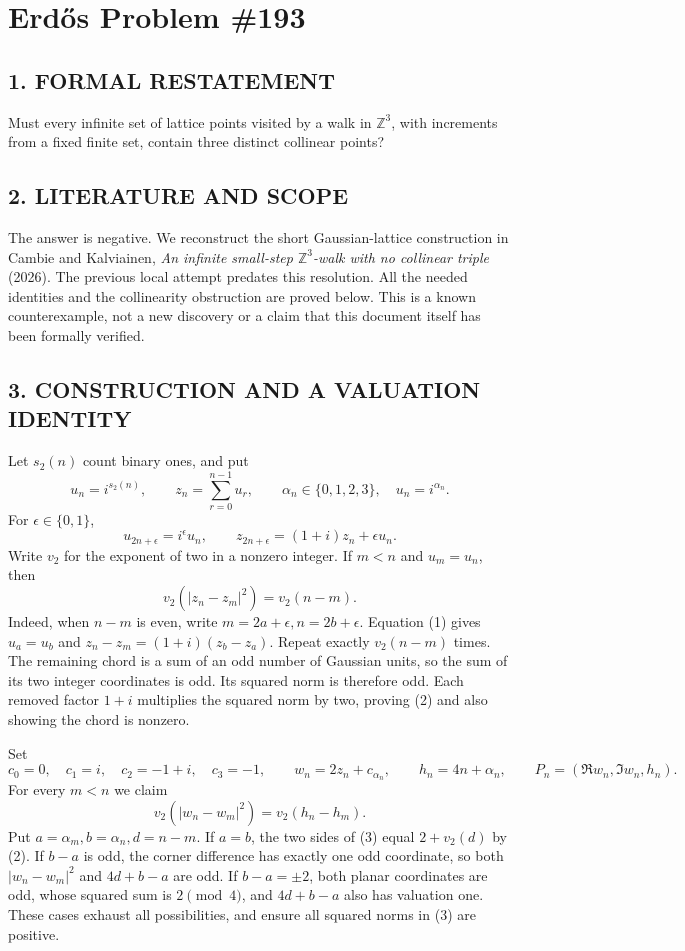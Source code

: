 \section{Erd\H{o}s Problem \#193}
\subsection*{1. FORMAL RESTATEMENT}
Must every infinite set of lattice points visited by a walk in $\mathbb Z^3$, with increments from a fixed finite set, contain three distinct collinear points?
\subsection*{2. LITERATURE AND SCOPE}
The answer is negative. We reconstruct the short Gaussian-lattice construction in Cambie and Kalviainen, \emph{An infinite small-step $\mathbb Z^3$-walk with no collinear triple} (2026). The previous local attempt predates this resolution. All the needed identities and the collinearity obstruction are proved below. This is a known counterexample, not a new discovery or a claim that this document itself has been formally verified.
\subsection*{3. CONSTRUCTION AND A VALUATION IDENTITY}
Let $s_2(n)$ count binary ones, and put
\[
 u_n=i^{s_2(n)},\qquad z_n=\sum_{r=0}^{n-1}u_r,\qquad
 \alpha_n\in\{0,1,2,3\},\quad u_n=i^{\alpha_n}.
\]
For $\epsilon\in\{0,1\}$,
\[
 u_{2n+\epsilon}=i^\epsilon u_n,\qquad
 z_{2n+\epsilon}=(1+i)z_n+\epsilon u_n.                 \tag{1}
\]
Write $v_2$ for the exponent of two in a nonzero integer. If $m<n$ and $u_m=u_n$, then
\[
 v_2(|z_n-z_m|^2)=v_2(n-m).                           \tag{2}
\]
Indeed, when $n-m$ is even, write $m=2a+\epsilon,n=2b+\epsilon$. Equation (1) gives $u_a=u_b$ and $z_n-z_m=(1+i)(z_b-z_a)$. Repeat exactly $v_2(n-m)$ times. The remaining chord is a sum of an odd number of Gaussian units, so the sum of its two integer coordinates is odd. Its squared norm is therefore odd. Each removed factor $1+i$ multiplies the squared norm by two, proving (2) and also showing the chord is nonzero.

Set
\[
 c_0=0,\quad c_1=i,\quad c_2=-1+i,\quad c_3=-1,
 \qquad w_n=2z_n+c_{\alpha_n},\qquad h_n=4n+\alpha_n,
 \qquad P_n=(\Re w_n,\Im w_n,h_n).
\]
For every $m<n$ we claim
\[
 v_2(|w_n-w_m|^2)=v_2(h_n-h_m).                      \tag{3}
\]
Put $a=\alpha_m,b=\alpha_n,d=n-m$. If $a=b$, the two sides of (3) equal $2+v_2(d)$ by (2). If $b-a$ is odd, the corner difference has exactly one odd coordinate, so both $|w_n-w_m|^2$ and $4d+b-a$ are odd. If $b-a=\pm2$, both planar coordinates are odd, whose squared sum is $2\pmod4$, and $4d+b-a$ also has valuation one. These cases exhaust all possibilities, and ensure all squared norms in (3) are positive.

